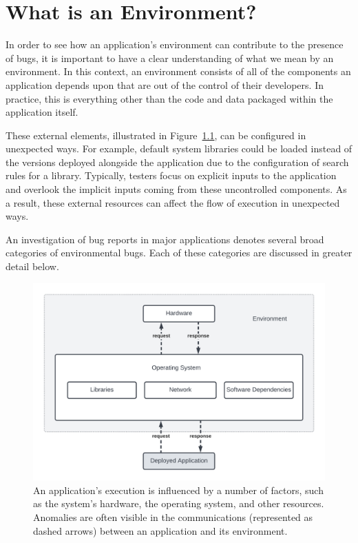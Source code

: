 \chapter{What is an Environment?}
\label{chap:background}

In order to see how an application's environment can contribute to the presence of bugs, it is important
to have a clear understanding
of what we mean by an environment. In this context, an environment consists of
all of the components an application depends upon
that are out of the control of their developers.
In practice, this is everything other than the code and data packaged
within the application itself.


These external elements,
illustrated in Figure~\ref{fig:environment},
can be
configured in unexpected ways.
For example, default system libraries could be loaded instead of
the versions deployed alongside the application due to the configuration of search rules for a library. 
Typically, testers
focus on explicit inputs to the application
and overlook the implicit inputs
coming from these uncontrolled components. As a result, these external resources can affect the flow of execution in unexpected ways.

An investigation of bug reports in major applications denotes several broad categories of environmental bugs. Each of these categories are discussed in greater detail below.

\begin{figure}[ht]
\centering
  \includegraphics[frame,scale=.85]{chapter2/figures/environment}
  \caption[Overview of Environmental Influences]{
    An application's execution is influenced by a number of factors, such as the system's hardware, the
    operating system,
    and other resources.  Anomalies are often visible in the communications (represented as dashed arrows) between an application and its environment.
   }
  \label{fig:environment}
\end{figure}


